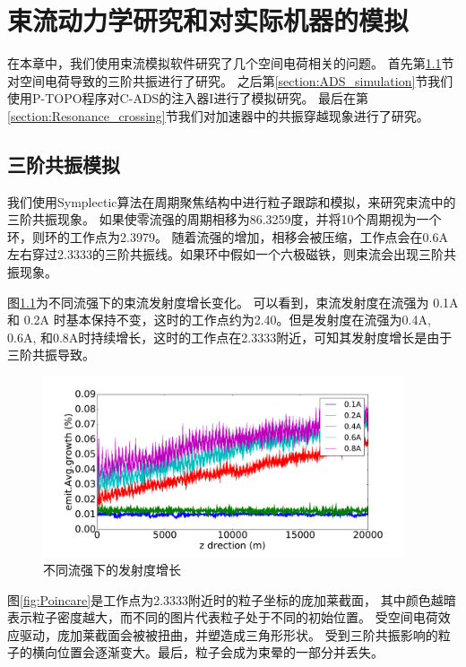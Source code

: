 \chapter{束流动力学研究和对实际机器的模拟} \label{chap:Simulation}
在本章中，我们使用束流模拟软件研究了几个空间电荷相关的问题。
首先第\ref{section:3rd_order_simulation}节对空间电荷导致的三阶共振进行了研究。
之后第\ref{section:ADS_simulation}节我们使用P-TOPO程序对C-ADS的注入器I进行了模拟研究。
最后在第\ref{section:Resonance_crossing}节我们对加速器中的共振穿越现象进行了研究。

\section{三阶共振模拟}            \label{section:3rd_order_simulation}
我们使用Symplectic算法在周期聚焦结构中进行粒子跟踪和模拟，来研究束流中的三阶共振现象。
如果使零流强的周期相移为86.3259度，并将10个周期视为一个环，则环的工作点为2.3979。
随着流强的增加，相移会被压缩，工作点会在0.6A左右穿过2.3333的三阶共振线。如果环中假如一个六极磁铁，则束流会出现三阶共振现象。

图\ref{fig:emitGrowthCompare}为不同流强下的束流发射度增长变化。
可以看到，束流发射度在流强为 0.1A 和 0.2A 时基本保持不变，这时的工作点约为2.40。但是发射度在流强为0.4A, 0.6A, 和0.8A时持续增长，这时的工作点在2.3333附近，可知其发射度增长是由于三阶共振导致。

\begin{figure}[!htb]
    \centering
    \includegraphics[width=0.95\textwidth]{Img/SymplecticEmitGrowthCompare.pdf}
    \caption{不同流强下的发射度增长}
    \label{fig:emitGrowthCompare}
\end{figure}

图\ref{fig:Poincare}是工作点为2.3333附近时的粒子坐标的庞加莱截面，
其中颜色越暗表示粒子密度越大，而不同的图片代表粒子处于不同的初始位置。
受空间电荷效应驱动，庞加莱截面会被被扭曲，并塑造成三角形形状。
受到三阶共振影响的粒子的横向位置会逐渐变大。最后，粒子会成为束晕的一部分并丢失。

